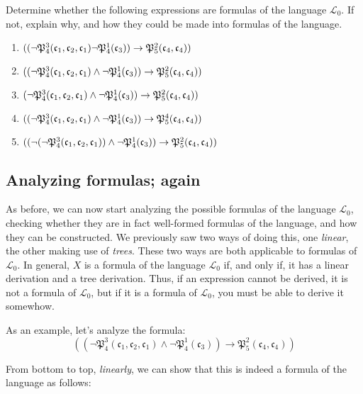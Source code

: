 \begin{exc}
Determine whether the following expressions are formulas of the language $\mathcal{L}_0$. If not, explain why, and how they could be made into formulas of the language. 

\begin{enumerate}
	\item $((\neg \mathfrak{P}^{3}_{4}(\mathfrak{c}_{1}, \mathfrak{c}_{2}, \mathfrak{c}_{1}) \neg \mathfrak{P}^{1}_{4}(\mathfrak{c}_{3})) \rightarrow \mathfrak{P}^{2}_{5}(\mathfrak{c}_{4}, \mathfrak{c}_{4}))$
	\item $((\neg \mathfrak{P}^{3}_{4}(\mathfrak{c}_{1}, \mathfrak{c}_{2}, \mathfrak{c}_{1}) \wedge \neg \mathfrak{P}^{1}_{4}(\mathfrak{c}_{3})) \rightarrow \mathfrak{P}^{2}_{5}(\mathfrak{c}_{4}, \mathfrak{c}_{4}))$
	\item $(\neg \mathfrak{P}^{3}_{4}(\mathfrak{c}_{1}, \mathfrak{c}_{2}, \mathfrak{c}_{1}) \wedge \neg \mathfrak{P}^{1}_{4}(\mathfrak{c}_{3})) \rightarrow \mathfrak{P}^{2}_{5}(\mathfrak{c}_{4}, \mathfrak{c}_{4}))$
	\item $((\neg \mathfrak{P}^{3}_{4}(\mathfrak{c}_{1}, \mathfrak{c}_{2}, \mathfrak{c}_{1}) \wedge \neg \mathfrak{P}^{1}_{4}(\mathfrak{c}_{3})) \rightarrow \mathfrak{P}^{4}_{5}(\mathfrak{c}_{4}, \mathfrak{c}_{4}))$
	\item $((\neg(\neg \mathfrak{P}^{3}_{4}(\mathfrak{c}_{1}, \mathfrak{c}_{2}, \mathfrak{c}_{1})) \wedge \neg \mathfrak{P}^{1}_{4}(\mathfrak{c}_{3})) \rightarrow \mathfrak{P}^{2}_{5}(\mathfrak{c}_{4}, \mathfrak{c}_{4}))$
\end{enumerate}
\end{exc}

\subsection{Analyzing formulas; again}

As before, we can now start analyzing the possible formulas of the language $\mathcal{L}_0$, checking whether they are in fact well-formed formulas of the language, and how they can be constructed. We previously saw two ways of doing this, one \textit{linear}, the other making use of \textit{trees}. These two ways are both applicable to formulas of $\mathcal{L}_0$. In general, $X$ is a formula of the language $\mathcal{L}_0$ if, and only if, it has a linear derivation and a tree derivation. Thus, if an expression cannot be derived, it is not a formula of $\mathcal{L}_0$, but if it is a formula of $\mathcal{L}_0$, you must be able to derive it somewhow.

As an example, let's analyze the formula:
\[
((\neg \mathfrak{P}^3_4(\mathfrak{c}_1, \mathfrak{c_2}, \mathfrak{c_1}) \wedge \neg \mathfrak{P}^1_4(\mathfrak{c}_3)) \rightarrow \mathfrak{P}^2_5(\mathfrak{c}_4, \mathfrak{c}_4))
\]

From bottom to top, \textit{linearly}, we can show that this is indeed a formula of the language as follows:

